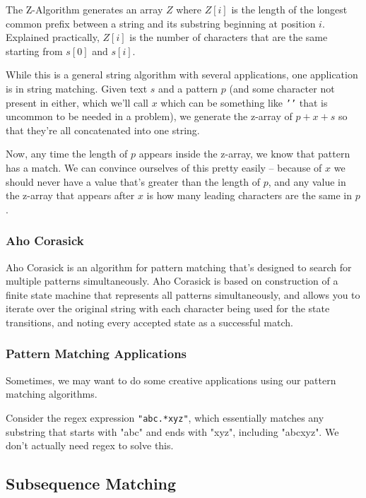 The Z-Algorithm generates an array $Z$ where $Z[i]$ is the length of the longest common prefix between a string and its substring beginning at position $i$. Explained practically, $Z[i]$ is the number of characters that are the same starting from $s[0]$ and $s[i]$.

While this is a general string algorithm with several applications, one application is in string matching. Given text $s$ and a pattern $p$ (and some character not present in either, which we'll call $x$ which can be something like \texttt{'\n'} that is uncommon to be needed in a problem), we generate the z-array of $p+x+s$ so that they're all concatenated into one string.

Now, any time the length of $p$ appears inside the z-array, we know that pattern has a match. We can convince ourselves of this pretty easily -- because of $x$ we should never have a value that's greater than the length of $p$, and any value in the z-array that appears after $x$ is how many leading characters are the same in $p$.

\subsubsection{Aho Corasick}

Aho Corasick is an algorithm for pattern matching that's designed to search for multiple patterns simultaneously. Aho Corasick is based on construction of a finite state machine that represents all patterns simultaneously, and allows you to iterate over the original string with each character being used for the state transitions, and noting every accepted state as a successful match.

\subsubsection{Pattern Matching Applications}

Sometimes, we may want to do some creative applications using our pattern matching algorithms.

Consider the regex expression \texttt{"abc.*xyz"}, which essentially matches any substring that starts with "abc" and ends with "xyz", including "abcxyz". We don't actually need regex to solve this.

\subsection{Subsequence Matching}

